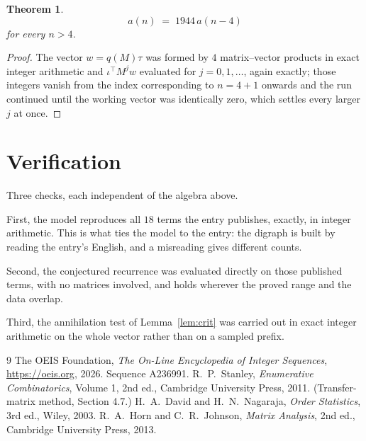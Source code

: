 \documentclass[11pt,a4paper]{article}
\theoremstyle{plain}
\newtheorem{theorem}{Theorem}
\theoremstyle{definition}
\begin{document}
\begin{theorem}
\[
a(n)\;=\;1944\,a(n-4)
\]
for every $n>4$.
\end{theorem}

\begin{proof}
The vector $w=q(M)\tau$ was formed by $4$ matrix--vector products in exact integer
arithmetic and $\iota^{\!\top}M^{j}w$ evaluated for $j=0,1,\dots$, again exactly; those
integers vanish from the index corresponding to $n=4+1$ onwards and the run continued
until the working vector was identically zero, which settles every larger $j$ at once.
\end{proof}

\section{Verification}

Three checks, each independent of the algebra above.

First, the model reproduces all $18$ terms the entry publishes, exactly, in integer
arithmetic. This is what ties the model to the entry: the digraph is built by reading the
entry's English, and a misreading gives different counts.

Second, the conjectured recurrence was evaluated directly on those published terms, with no
matrices involved, and holds wherever the proved range and the data overlap.

Third, the annihilation test of Lemma~\ref{lem:crit} was carried out in exact integer
arithmetic on the whole vector rather than on a sampled prefix.

\begin{thebibliography}{9}
 The OEIS Foundation, \emph{The On-Line Encyclopedia of Integer
Sequences}, \url{https://oeis.org}, 2026. Sequence A236991.
 R.~P.~Stanley, \emph{Enumerative Combinatorics}, Volume 1, 2nd ed.,
Cambridge University Press, 2011. (Transfer-matrix method, Section 4.7.)
 H.~A.~David and H.~N.~Nagaraja, \emph{Order Statistics}, 3rd ed., Wiley,
2003.
 R.~A.~Horn and C.~R.~Johnson, \emph{Matrix Analysis}, 2nd ed., Cambridge
University Press, 2013.
\end{thebibliography}
\end{document}
